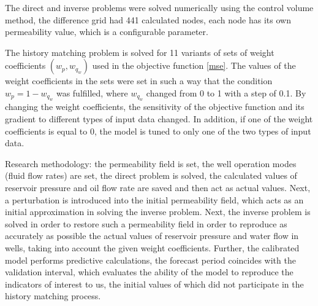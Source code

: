 \documentclass[
11pt,%
tightenlines,%
twoside,%
onecolumn,%
nofloats,%
nobibnotes,%
nofootinbib,%
superscriptaddress,%
noshowpacs,%
centertags]%
{revtex4}
\begin{document}
The direct and inverse problems were solved numerically using the control volume method, the difference grid had 441 calculated nodes, each node has its own permeability value, which is a configurable parameter.

The history matching problem is solved for 11 variants of sets of weight coefficients $(w_p, w_{q_w})$ used in the objective function {\ref{mse}}. The values of the weight coefficients in the sets were set in such a way that the condition $w_p = 1 - w_{q_w}$ was fulfilled, where $w_{q_w}$ changed from 0 to 1 with a step of 0.1. By changing the weight coefficients, the sensitivity of the objective function and its gradient to different types of input data changed. In addition, if one of the weight coefficients is equal to 0, the model is tuned to only one of the two types of input data.

Research methodology: the permeability field is set, the well operation modes (fluid flow rates) are set, the direct problem is solved, the calculated values of reservoir pressure and oil flow rate are saved and then act as actual values. Next, a perturbation is introduced into the initial permeability field, which acts as an initial approximation in solving the inverse problem. Next, the inverse problem is solved in order to restore such a permeability field in order to reproduce as accurately as possible the actual values of reservoir pressure and water flow in wells, taking into account the given weight coefficients. Further, the calibrated model performs predictive calculations, the forecast period coincides with the validation interval, which evaluates the ability of the model to reproduce the indicators of interest to us, the initial values of which did not participate in the history matching process.
\end{document}

